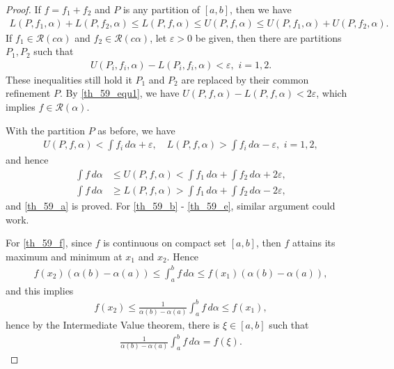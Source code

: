 \documentclass[10pt]{book}
\theoremstyle{definition}
\numberwithin{equation}{chapter}
\begin{document}
\begin{proof}
If $f = f_1 + f_2$ and $P$ is any partition of $[a,b]$, then we have
\begin{align}\label{th_59_equ1}
    L(P,f_1,\alpha) + L(P,f_2,\alpha) \leq L(P,f,\alpha) \leq U(P,f,\alpha) \leq U(P,f_1,\alpha) + U(P,f_2,\alpha).
\end{align}
If $f_1 \in \mathscr{R}(c\alpha)$ and $f_2 \in \mathscr{R}(c\alpha)$, let $\varepsilon > 0$ be given, then there are partitions $P_1, P_2$ such that
\begin{align*}
    U(P_i,f_i,\alpha) - L(P_i,f_i,\alpha) < \varepsilon, \,\, i = 1,2.
\end{align*}
These inequalities still hold it $P_1$ and $P_2$ are replaced by their common refinement $P$. By \eqref{th_59_equ1}, we have $U(P,f,\alpha) - L(P,f,\alpha) < 2\varepsilon$, which implies $f \in \mathscr{R}(\alpha)$.

With the partition $P$ as before, we have
\begin{align*}
    U(P,f,\alpha) < \int f_i \,d\alpha + \varepsilon, \quad L(P,f,\alpha) >  \int f_i \,d\alpha - \varepsilon, \,\, i = 1,2,
\end{align*}
and hence
\begin{align*}
    \int f \,d\alpha & \leq U(P,f,\alpha) < \int f_1 \,d\alpha + \int f_2 \,d\alpha + 2 \varepsilon, \\
    \int f \,d\alpha & \geq L(P,f,\alpha) > \int f_1 \,d\alpha + \int f_2 \,d\alpha - 2 \varepsilon,
\end{align*}
and \ref{th_59_a} is proved. For \ref{th_59_b} - \ref{th_59_e}, similar argument could work.

For \ref{th_59_f}, since $f$ is continuous on compact set $[a,b]$, then $f$ attains its maximum and minimum at $x_1$ and $x_2$. Hence
\begin{align*}
    f(x_2) (\alpha(b) - \alpha(a)) \leq \int^b_a f \,d\alpha \leq f(x_1) (\alpha(b) - \alpha(a)),
\end{align*}
and this implies
\begin{align*}
    f(x_2) \leq \frac{1}{\alpha(b) - \alpha(a)} \int^b_a f \,d\alpha \leq f(x_1),
\end{align*}
hence by the Intermediate Value theorem, there is $\xi \in [a,b]$ such that
\begin{align*}
    \frac{1}{\alpha(b) - \alpha(a)} \int^b_a f \,d\alpha = f(\xi).
\end{align*}
\end{proof}
\end{document}
